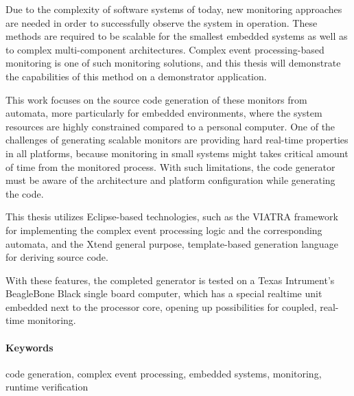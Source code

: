 Due to the complexity of software systems of today, new monitoring approaches are needed in order to successfully observe the system in operation. These methods are required to be scalable for the smallest embedded systems as well as to complex multi-component architectures. Complex event processing-based monitoring is one of such monitoring solutions, and this thesis will demonstrate the capabilities of this method on a demonstrator application.

This work focuses on the source code generation of these monitors from automata, more particularly for embedded environments, where the system resources are highly constrained compared to a personal computer. One of the challenges of generating scalable monitors are providing hard real-time properties in all platforms, because monitoring in small systems might takes critical amount of time from the monitored process. With such limitations, the code generator must be aware of the architecture and platform configuration while generating the code.

This thesis utilizes Eclipse-based technologies, such as the VIATRA framework for implementing the complex event processing logic and the corresponding automata, and the Xtend general purpose, template-based generation language for deriving source code.

With these features, the completed generator is tested on a Texas Intrument's BeagleBone Black single board computer, which has a special realtime unit embedded next to the processor core, opening up possibilities for coupled, real-time monitoring.

\paragraph{Keywords} code generation, complex event processing, embedded systems, monitoring, runtime verification
